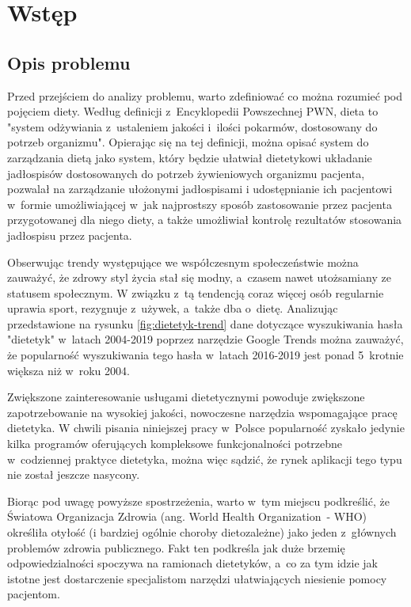 \chapter*{Wstęp}\label{ch:admission}

\section*{Opis problemu}\label{sec:problem-description}

Przed przejściem do analizy problemu, warto zdefiniować co można rozumieć pod pojęciem diety.
Według definicji z~Encyklopedii Powszechnej PWN, dieta to "system odżywiania z~ustaleniem jakości i~ilości pokarmów,
dostosowany do potrzeb organizmu"\cite{book:encyklopedia-dieta}.
Opierając się na tej definicji, można opisać system do zarządzania dietą jako system,
który będzie ułatwiał dietetykowi układanie jadłospisów dostosowanych do potrzeb żywieniowych organizmu pacjenta, pozwalał na zarządzanie ułożonymi jadłospisami
i udostępnianie ich pacjentowi w~formie umożliwiającej w~jak najprostszy sposób zastosowanie przez pacjenta przygotowanej dla niego diety,
a także umożliwiał kontrolę rezultatów stosowania jadłospisu przez pacjenta.

\par
Obserwując trendy występujące we współczesnym społeczeństwie można zauważyć, że zdrowy styl życia stał się modny, a~czasem nawet utożsamiany ze statusem społecznym.
W związku z~tą tendencją coraz więcej osób regularnie uprawia sport, rezygnuje z~używek, a~także dba o~dietę.
Analizując przedstawione na rysunku \ref{fig:dietetyk-trend} dane dotyczące wyszukiwania hasła "dietetyk" w~latach 2004-2019 poprzez narzędzie Google Trends\cite{url:google-trends} można zauważyć,
że popularność wyszukiwania tego hasła w~latach 2016-2019 jest ponad 5~krotnie większa niż w~roku 2004.


Zwiększone zainteresowanie usługami dietetycznymi powoduje zwiększone zapotrzebowanie na wysokiej jakości, nowoczesne narzędzia wspomagające pracę dietetyka.
W chwili pisania niniejszej pracy w~Polsce popularność zyskało jedynie kilka programów oferujących kompleksowe funkcjonalności potrzebne w~codziennej praktyce dietetyka,
można więc sądzić, że rynek aplikacji tego typu nie został jeszcze nasycony.

\par
Biorąc pod uwagę powyższe spostrzeżenia, warto w~tym miejscu podkreślić, że Światowa Organizacja Zdrowia (ang. World Health Organization~- WHO) określiła otyłość
(i bardziej ogólnie choroby dietozależne) jako jeden z~głównych problemów zdrowia publicznego\cite{article:dietetyk-na-rynku-uslug-medycznych}.
Fakt ten podkreśla jak duże brzemię odpowiedzialności spoczywa na ramionach dietetyków,
a~co za tym idzie jak istotne jest dostarczenie specjalistom narzędzi ułatwiających niesienie pomocy pacjentom.

